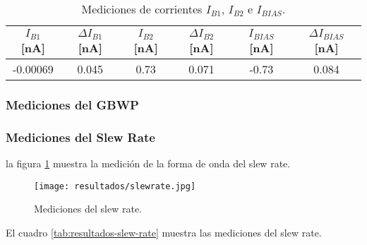\begin{table}[h!]
\centering
\begin{tabular}{|c|c|c|c|c|c|}
\hline
$I_{B1}$ [nA] & $\Delta I_{B1}$ [nA] & $I_{B2}$ [nA] & $\Delta I_{B2}$ [nA] & $I_{BIAS}$ [nA] & $\Delta I_{BIAS}$ [nA] \\ \hline
-0.00069 & 0.045 & 0.73 & 0.071 & -0.73 & 0.084 \\ \hline
\end{tabular}
\caption{Mediciones de corrientes $I_{B1}$, $I_{B2}$ e $I_{BIAS}$.}
\label{tab:resultados-corrientes-bias}
\end{table}

\subsubsection{Mediciones del GBWP}

\begin{table}[h!]
\centering
{}
\caption{Mediciones del producto ganancia ancho de banda.}
\label{tab:resultados-gbwp}
\end{table}

\subsubsection{Mediciones del Slew Rate}

la figura \ref{fig:resultados-slew-rate} muestra la medición de la forma de onda del slew rate.

\begin{figure}[htbp]
\centering
\texttt{[image: resultados/slewrate.jpg]}
\caption{Mediciones del slew rate.}
\label{fig:resultados-slew-rate}
\end{figure}

El cuadro \ref{tab:resultados-slew-rate} muestra las mediciones del slew rate.

